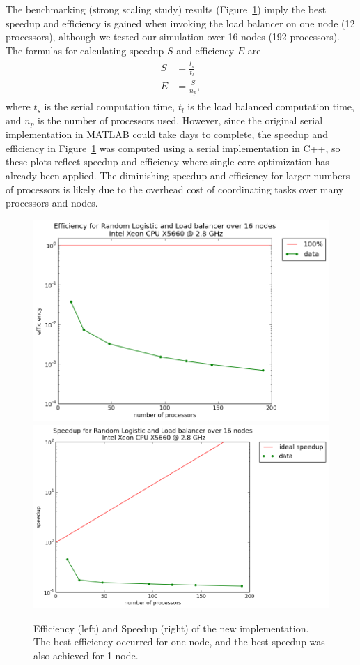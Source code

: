 The benchmarking (strong scaling study) results (Figure~\ref{fig:effsp}) imply
the best speedup and efficiency is gained when invoking the load balancer on
one node (12 processors), although we tested our simulation over 16 nodes
(192 processors). The formulas for calculating speedup $S$ and
efficiency $E$ are
\begin{align}
\begin{split}
S &= \frac{t_s}{t_l}\\
E &= \frac{S}{n_p},
\end{split}
\end{align}
where $t_s$ is the serial computation time, $t_l$ is the load balanced
computation time, and $n_p$ is the number of processors used. However,
since the original serial implementation in MATLAB could take days to complete,
the speedup and efficiency in Figure~\ref{fig:effsp} was computed using a
serial implementation in C++, so these plots reflect speedup and
efficiency where single core optimization has already been applied. The
diminishing speedup and efficiency for larger numbers of processors is
likely due to the overhead cost of coordinating tasks over many
processors and nodes. 
\begin{figure}[htp]
\caption[Impact of the load balancing tool: efficiency and
speedup]{Efficiency (left) and Speedup (right) of the new
  implementation. The best efficiency occurred for one node, and the best speedup was also achieved for 1 node.}\label{fig:effsp}
\centering
\includegraphics[width=.5\textwidth]{figs/efficiency_random_logistic.png}\hfill
\includegraphics[width=.5\textwidth]{figs/speedup_random_logistic.png}
\end{figure}

